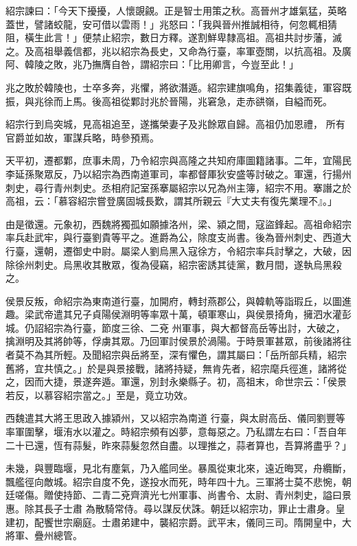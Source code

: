 \begin{pinyinscope}
 紹宗諫曰：「今天下擾擾，人懷覬覦。正是智士用策之秋。高晉州才雄氣猛，英略蓋世，譬諸蛟龍，安可借以雲雨！」兆怒曰：「我與晉州推誠相待，何忽輒相猜
 阻，橫生此言！」便禁止紹宗，數日方釋。遂割鮮卑隸高祖。高祖共討步藩，滅之。及高祖舉義信都，兆以紹宗為長史，又命為行臺，率軍壺關，以抗高祖。及廣阿、韓陵之敗，兆乃撫膺自咎，謂紹宗曰：「比用卿言，今豈至此！」



 兆之敗於韓陵也，士卒多奔，兆懼，將欲潛遁。紹宗建旗鳴角，招集義徒，軍容既振，與兆徐而上馬。後高祖從鄴討兆於晉陽，兆窘急，走赤谼嶺，自縊而死。



 紹宗行到烏突城，見高祖追至，遂攜榮妻子及兆餘眾自歸。高祖仍加恩禮，
 所有官爵並如故，軍謀兵略，時參預焉。



 天平初，遷都鄴，庶事未周，乃令紹宗與高隆之共知府庫圖籍諸事。二年，宜陽民李延孫聚眾反，乃以紹宗為西南道軍司，率都督厙狄安盛等討破之。軍還，行揚州刺史，尋行青州刺史。丞相府記室孫搴屬紹宗以兄為州主簿，紹宗不用。搴譖之於高祖，云：「慕容紹宗嘗登廣固城長歎，謂其所親云『大丈夫有復先業理不』。」



 由是徵還。元象初，西魏將獨孤如願據洛州，梁、潁之間，寇盜鋒起。高祖命紹宗
 率兵赴武牢，與行臺劉貴等平之。進爵為公，除度支尚書。後為晉州刺史、西道大行臺，還朝，遷御史中尉。屬梁人劉烏黑入寇徐方，令紹宗率兵討擊之，大破，因除徐州刺史。烏黑收其散眾，復為侵竊，紹宗密誘其徒黨，數月間，遂執烏黑殺之。



 侯景反叛，命紹宗為東南道行臺，加開府，轉封燕郡公，與韓軌等詣瑕丘，以圖進趣。梁武帝遣其兄子貞陽侯淵明等率眾十萬，頓軍寒山，與侯景掎角，擁泗水灌彭城。仍詔紹宗為行臺，節度三徐、二兗
 州軍事，與大都督高岳等出討，大破之，擒淵明及其將帥等，俘虜其眾。乃回軍討侯景於渦陽。于時景軍甚眾，前後諸將往者莫不為其所輕。及聞紹宗與岳將至，深有懼色，謂其屬曰：「岳所部兵精，紹宗舊將，宜共慎之。」於是與景接戰，諸將持疑，無肯先者，紹宗麾兵徑進，諸將從之，因而大捷，景遂奔遁。軍還，別封永樂縣子。初，高祖末，命世宗云：「侯景若反，以慕容紹宗當之。」至是，竟立功效。



 西魏遣其大將王思政入據潁州，又以紹宗為南道
 行臺，與太尉高岳、儀同劉豐等率軍圍擊，堰洧水以灌之。時紹宗頻有凶夢，意每惡之。乃私謂左右曰：「吾自年二十已還，恆有蒜髮，昨來蒜髮忽然自盡。以理推之，蒜者算也，吾算將盡乎？」



 未幾，與豐臨堰，見北有塵氣，乃入艦同坐。暴風從東北來，遠近晦冥，舟纜斷，飄艦徑向敵城。紹宗自度不免，遂投水而死，時年四十九。三軍將士莫不悲惋，朝廷嗟傷。贈使持節、二青二兗齊濟光七州軍事、尚書令、太尉、青州刺史，謚曰景惠。除其長子士肅
 為散騎常侍。尋以謀反伏誅。朝廷以紹宗功，罪止士肅身。皇建初，配饗世宗廟庭。士肅弟建中，襲紹宗爵。武平末，儀同三司。隋開皇中，大將軍、疊州總管。




\end{pinyinscope}
